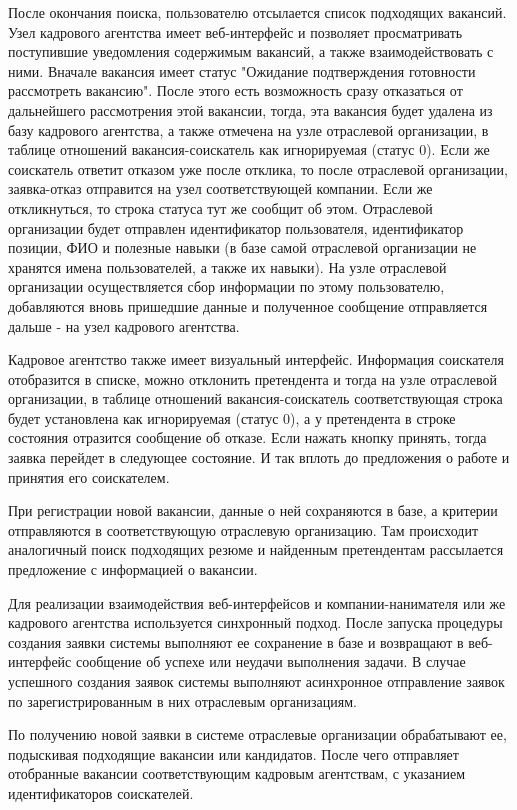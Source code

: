 После окончания поиска, пользователю отсылается список подходящих вакансий.
Узел кадрового агентства имеет веб-интерфейс и позволяет просматривать поступившие уведомления содержимым вакансий, а также взаимодействовать с ними.
Вначале вакансия имеет статус "Ожидание подтверждения готовности рассмотреть вакансию". После этого есть возможность сразу отказаться от дальнейшего рассмотрения этой вакансии, тогда, эта вакансия будет удалена из базу кадрового агентства, а также отмечена на узле отраслевой организации, в таблице отношений вакансия-соискатель как игнорируемая (статус 0). Если же соискатель ответит отказом уже после отклика, то после отраслевой организации, заявка-отказ отправится на узел соответствующей компании.
Если же откликнуться, то строка статуса тут же сообщит об этом. Отраслевой организации будет отправлен идентификатор пользователя, идентификатор позиции, ФИО и полезные навыки (в базе самой отраслевой организации не хранятся имена пользователей, а также их навыки). 
На узле отраслевой организации осуществляется сбор информации по этому пользователю, добавляются вновь пришедшие данные и полученное сообщение отправляется дальше - на узел кадрового агентства.

Кадровое агентство также имеет визуальный интерфейс.
Информация соискателя отобразится в списке, можно отклонить претендента и тогда на узле отраслевой организации, в таблице отношений вакансия-соискатель соответствующая строка будет установлена как игнорируемая (статус 0), а у претендента в строке состояния отразится сообщение об отказе. 
Если нажать кнопку принять, тогда заявка перейдет в следующее состояние. И так вплоть до предложения о работе и принятия его соискателем.

При регистрации новой вакансии, данные о ней сохраняются в базе, а критерии отправляются в соответствующую отраслевую организацию. Там происходит аналогичный поиск подходящих резюме и найденным претендентам рассылается предложение с информацией о вакансии.



Для реализации взаимодействия веб-интерфейсов и компании-нанимателя или же кадрового агентства используется синхронный подход. После запуска процедуры создания заявки системы выполняют ее сохранение в базе и возвращают в веб-интерфейс сообщение об успехе или неудачи выполнения задачи. В случае успешного создания заявок системы выполняют асинхронное отправление заявок по зарегистрированным в них отраслевым организациям.

По получению новой заявки в системе отраслевые организации обрабатывают ее, подыскивая подходящие вакансии или кандидатов. После чего отправляет отобранные вакансии соответствующим кадровым агентствам, с указанием идентификаторов соискателей.

